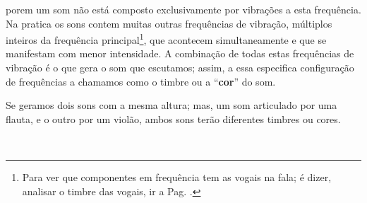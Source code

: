 \begin{description}
porem um som não está composto exclusivamente por vibrações a esta frequência.
Na pratica os sons contem muitas outras frequências de vibração, 
múltiplos inteiros da frequência principal\footnote{Para 
ver que componentes em frequência tem as vogais na fala;
é dizer, analisar o timbre das vogais, ir a Pag. \pageref{fig:timbresvocais}.}, 
que acontecem simultaneamente e 
que se manifestam com menor intensidade.
A combinação de todas estas frequências de vibração é o que gera o som que escutamos;
assim, a essa especifica configuração de frequências a chamamos como o timbre ou
a ``\textbf{cor}'' do som.
\begin{example}
Se geramos dois sons com a mesma altura; mas, um som articulado por uma flauta,
e o outro por um violão, ambos sons terão diferentes timbres ou cores.
\end{example} 
\end{description}
~\\



